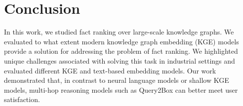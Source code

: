 \section{Conclusion}\label{sec:conclusion}
In this work, we studied fact ranking over large-scale knowledge graphs. We evaluated to what extent modern knowledge graph embedding (KGE) models provide a solution for addressing the problem of fact ranking. We highlighted unique challenges associated with solving this task in industrial settings and evaluated different KGE and text-based embedding models. Our work demonstrated that, in contrast to neural language models or shallow KGE models, multi-hop reasoning models such as Query2Box can better meet user satisfaction.

